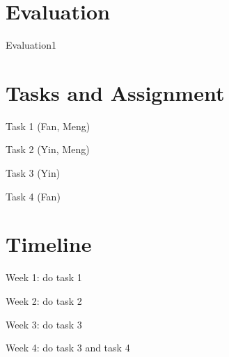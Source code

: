 \section{Evaluation}
\begin{compactitem}
\item Evaluation1
\end{compactitem}

\section{Tasks and Assignment}

\begin{compactitem}
\item Task 1 (Fan, Meng)
\item Task 2 (Yin, Meng)
\item Task 3 (Yin)
\item Task 4 (Fan)
\end{compactitem}


\section{Timeline}
\begin{compactitem}
\item Week 1: do task 1
\item Week 2: do task 2
\item Week 3: do task 3
\item Week 4: do task 3 and task 4
\end{compactitem}



